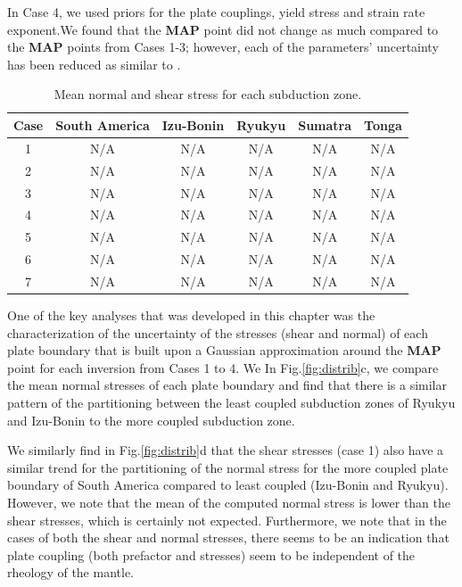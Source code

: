 \documentclass[12pt]{article}
\begin{document}
In Case 4, we  used priors for the plate couplings, yield stress and strain rate exponent.We found that the \textbf{MAP} point did not change as much compared to the \textbf{MAP} points from Cases 1-3; however, each of the parameters' uncertainty has been reduced as similar to \citep{ratnaswamy2015adjoint}.


\begin{table}[H]
  \caption{Mean normal and shear stress for each subduction zone.} %
  \centering  %
  \begin{tabular}{c c c c c c} %
    \hline \hline                        %
    Case & South America & Izu-Bonin & Ryukyu & Sumatra & Tonga   \\ [0.5ex] %
    \hline                  %
    1 & N/A  & N/A &N/A & N/A & N/A \\
    2 &  N/A  & N/A &N/A & N/A & N/A \\
    3 &  N/A  & N/A &N/A & N/A & N/A \\
    4 &  N/A  & N/A &N/A & N/A & N/A \\
    5 &  N/A  & N/A &N/A & N/A & N/A \\
    6 &  N/A  & N/A &N/A & N/A & N/A \\
   7 & N/A  & N/A &N/A & N/A & N/A \\
    \hline %
  \end{tabular}
  \label{table:parameters} %
\end{table}


One of the key analyses that was developed in this chapter was the characterization of the uncertainty of the stresses (shear and normal) of each plate boundary that is built upon a Gaussian approximation around the \textbf{MAP} point for each inversion from Cases 1 to 4. We  In Fig.\ref{fig:distrib}c, we compare the mean normal stresses of each plate boundary and find that there is a similar pattern of the partitioning between the least coupled subduction zones of Ryukyu and Izu-Bonin to the more coupled subduction zone.

We similarly find in Fig.\ref{fig:distrib}d that the shear stresses (case 1) also have a similar trend for the partitioning of the normal stress for the more coupled plate boundary of South America compared to least coupled (Izu-Bonin and Ryukyu). However, we note that the mean of the computed normal stress is lower than the shear stresses, which is certainly not expected. Furthermore, we note that in the cases of both the shear and normal stresses, there seems to be an indication that plate coupling (both prefactor and stresses) seem to be independent of the rheology of the mantle.
\end{document}
